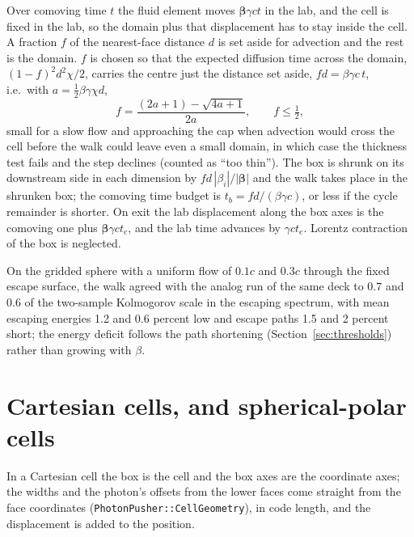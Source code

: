 \documentclass[11pt]{article}
\begin{document}
Over comoving time $t$ the fluid element moves $\boldsymbol\beta\gamma ct$ in the lab,
and the cell is fixed in the lab, so the domain plus that displacement has to stay inside
the cell.  A fraction $f$ of the nearest-face distance $d$ is set aside for advection
and the rest is the domain.  $f$ is chosen so that the expected diffusion time across
the domain, $(1-f)^2d^2\chi/2$, carries the centre just the distance set aside,
$fd=\beta\gamma c\,t$, i.e.\ with $a=\tfrac12\beta\gamma\chi d$,
\begin{equation}
  f=\frac{(2a+1)-\sqrt{4a+1}}{2a},\qquad f\le\tfrac12,
\end{equation}
small for a slow flow and approaching the cap when advection would cross the cell before
the walk could leave even a small domain, in which case the thickness test fails and the
step declines (counted as ``too thin'').  The box is shrunk on its downstream side in
each dimension by $fd\,|\beta_i|/|\boldsymbol\beta|$ and the walk takes place in the
shrunken box; the comoving time budget is $t_b=fd/(\beta\gamma c)$, or less if the cycle
remainder is shorter.  On exit the lab displacement along the box axes is the comoving
one plus $\boldsymbol\beta\gamma ct_e$, and the lab time advances by $\gamma ct_e$.
Lorentz contraction of the box is neglected.

On the gridded sphere with a uniform flow of $0.1c$ and $0.3c$ through the fixed escape
surface, the walk agreed with the analog run of the same deck to $0.7$ and $0.6$ of the
two-sample Kolmogorov scale in the escaping spectrum, with mean escaping energies
1.2 and 0.6 percent low and escape paths 1.5 and 2 percent short; the energy deficit
follows the path shortening (Section~\ref{sec:thresholds}) rather than growing with
$\beta$.

\section{Cartesian cells, and spherical-polar cells}
\label{sec:cells}

In a Cartesian cell the box is the cell and the box axes are the coordinate axes; the
widths and the photon's offsets from the lower faces come straight from the face
coordinates (\texttt{PhotonPusher::CellGeometry}), in code length, and the displacement
is added to the position.
\end{document}
